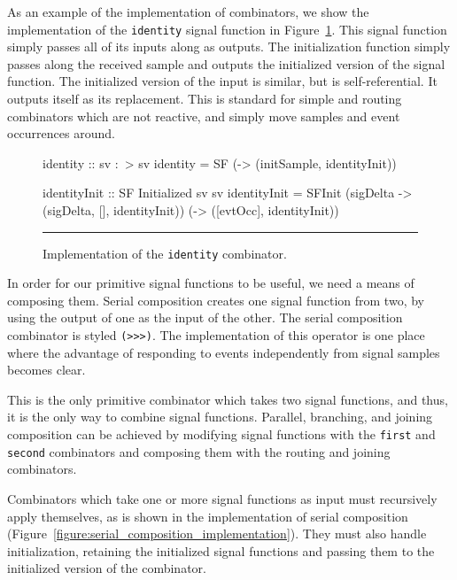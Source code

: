 As an example of the implementation of combinators, we show the implementation
of the {\tt identity} signal function in Figure~\ref{figure:identity_implementation}.
This signal function simply passes all of its inputs along as outputs. The
initialization function simply passes along the received sample and outputs the
initialized version of the signal function. The initialized version of the input
is similar, but is self-referential. It outputs itself as its replacement. This
is standard for simple and routing combinators which are not reactive, and
simply move samples and event occurrences around.

\begin{figure}
\begin{code}
identity :: sv :~> sv
identity =
  SF (\initSample -> (initSample, identityInit))

identityInit :: SF Initialized sv sv
identityInit =
  SFInit (\dt sigDelta -> (sigDelta, [], identityInit))
         (\evtOcc -> ([evtOcc], identityInit))
\end{code}
\hrule
\caption{Implementation of the {\tt identity} combinator.}
\label{figure:identity_implementation}
\end{figure}

In order for our primitive signal functions to be useful, we need a means of
composing them. Serial composition creates one signal function from two, by
using the output of one as the input of the other. The serial composition
combinator is styled {\tt (>>>)}. The implementation of this operator is one
place where the advantage of responding to events independently from signal
samples becomes clear. 

This is the only primitive combinator which takes two signal functions, and
thus, it is the only way to combine signal functions. Parallel, branching, and
joining composition can be achieved by modifying signal functions with the
{\tt first} and {\tt second} combinators and composing them with the
routing and joining combinators.

Combinators which take one or more signal functions as input must recursively
apply themselves, as is shown in the implementation of serial composition
(Figure~\ref{figure:serial_composition_implementation}). They must also
handle initialization, retaining the initialized signal functions and passing
them to the initialized version of the combinator.

